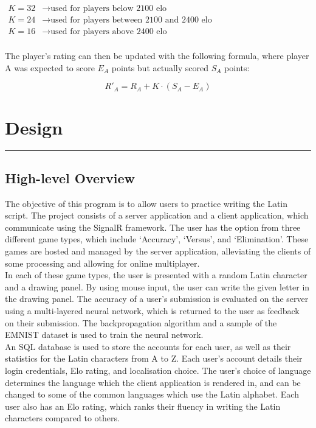 \documentclass{article}
\begin{document}
\(\begin{aligned}
    K=32&\longrightarrow \text{used for players below 2100 elo} \\
    K=24&\longrightarrow \text{used for players between 2100 and 2400 elo} \\
    K=16&\longrightarrow \text{used for players above 2400 elo} \\
\end{aligned}\)
\vspace{1em}

The player's rating can then be updated with the following formula, where player A was expected to score \(E_A\) points but actually scored \(S_A\) points:

\begin{equation*}
    R'_A=R_A+K\cdot (S_A-E_A)
\end{equation*}

\newpage
\section{Design}
\noindent\rule{\textwidth}{0.2pt}
\subsection{High-level Overview}

The objective of this program is to allow users to practice writing the Latin script. The project consists of a server application and a client application, which communicate using the SignalR framework. The user has the option from three different game types, which include `Accuracy', `Versus', and `Elimination'. These games are hosted and managed by the server application, alleviating the clients of some processing and allowing for online multiplayer.\\

In each of these game types, the user is presented with a random Latin character and a drawing panel. By using mouse input, the user can write the given letter in the drawing panel. The accuracy of a user's submission is evaluated on the server using a multi-layered neural network, which is returned to the user as feedback on their submission. The backpropagation algorithm and a sample of the EMNIST dataset is used to train the neural network. \\

An SQL database is used to store the accounts for each user, as well as their statistics for the Latin characters from A to Z. Each user's account details their login credentials, Elo rating, and localisation choice. The user's choice of language determines the language which the client application is rendered in, and can be changed to some of the common languages which use the Latin alphabet. Each user also has an Elo rating, which ranks their fluency in writing the Latin characters compared to others. \\
\end{document}
